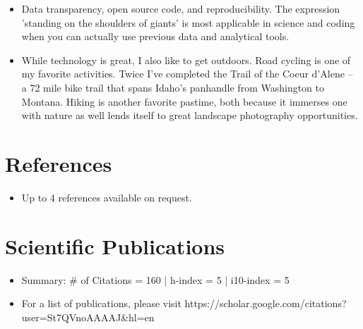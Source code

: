\documentclass[11pt,a4paper,sans]{moderncv}        %
\begin{document}
\begin{itemize}

\item{Data transparency, open source code, and reproducibility. The expression 'standing on the shoulders of giants' is most applicable in science and coding when you can actually use previous data and analytical tools.}

\vspace{6pt}

\item{While technology is great, I also like to get outdoors. Road cycling is one of my favorite activities. Twice I've completed the Trail of the Coeur d'Alene -- a 72 mile bike trail that spans Idaho's panhandle from Washington to Montana. Hiking is another favorite pastime, both because it immerses one with nature as well lends itself to great landscape photography opportunities.}



\end{itemize}

\section{References}

\vspace{6pt}
 
\begin{itemize}

\item{Up to 4 references available on request.}

\end{itemize}

\section{Scientific Publications}

\vspace{6pt}
 
\begin{itemize}

\item{Summary: \# of Citations = 160 |  h-index = 5 | i10-index = 5}
\vspace{6pt}
\item{For a list of publications, please visit https://scholar.google.com/citations?user=St7QVnoAAAAJ\&hl=en}


\end{itemize}
\end{document}
